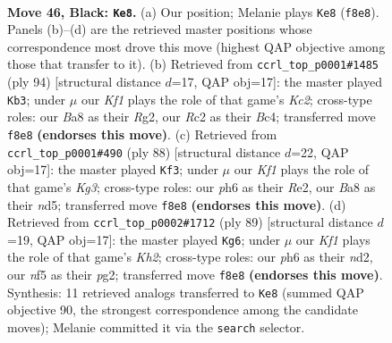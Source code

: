 \documentclass[11pt]{article}
\begin{document}
\clearpage

\begin{figure}[p]\centering
\begin{subfigure}{0.46\textwidth}\centering
\resizebox{\linewidth}{!}{%
\newchessgame
\chessboard[
  setfen={b4k2/P4p1K/7P/4PN2/8/R4p2/2r5/8 b - - 0 46},
  showmover=false,
  pgfstyle=straightmove, color=movearrow, markmove={f8-e8}
]}
\caption{}
\end{subfigure}\hfill
\begin{subfigure}{0.46\textwidth}\centering
\resizebox{\linewidth}{!}{%
\newchessgame
\chessboard[
  setfen={5r1k/7p/2n5/p3p3/2B1P3/8/1PK2PR1/8 w - - 6 48},
  showmover=false,
  pgfstyle=straightmove, color=movearrow, markmove={c2-b3}
]}
\caption{}
\end{subfigure}
\\[4pt]
\begin{subfigure}{0.46\textwidth}\centering
\resizebox{\linewidth}{!}{%
\newchessgame
\chessboard[
  setfen={8/3k4/2p4B/3n4/2r3P1/1p4K1/1P2R3/8 w - - 0 45},
  showmover=false,
  pgfstyle=straightmove, color=movearrow, markmove={g3-f3}
]}
\caption{}
\end{subfigure}\hfill
\begin{subfigure}{0.46\textwidth}\centering
\resizebox{\linewidth}{!}{%
\newchessgame
\chessboard[
  setfen={3b4/6pk/1r6/8/R6p/7P/3N1PP1/5K2 b - - 9 45},
  showmover=false,
  pgfstyle=straightmove, color=movearrow, markmove={h7-g6}
]}
\caption{}
\end{subfigure}
\caption{\textbf{Move 46, Black: \texttt{Ke8}.} (a) Our position; Melanie plays \texttt{Ke8} (\texttt{f8e8}). Panels (b)--(d) are the retrieved master positions whose correspondence most drove this move (highest QAP objective among those that transfer to it). (b) Retrieved from \texttt{ccrl\_top\_p0001\#1485} (ply 94) [structural distance $d$=17, QAP obj=17]: the master played \texttt{Kb3}; under $\mu$ our \emph{Kf1} plays the role of that game's \emph{Kc2}; cross-type roles: our \emph{B}a8 as their \emph{R}g2, our \emph{R}c2 as their \emph{B}c4; transferred move \texttt{f8e8} \textbf{(endorses this move)}. (c) Retrieved from \texttt{ccrl\_top\_p0001\#490} (ply 88) [structural distance $d$=22, QAP obj=17]: the master played \texttt{Kf3}; under $\mu$ our \emph{Kf1} plays the role of that game's \emph{Kg3}; cross-type roles: our \emph{p}h6 as their \emph{R}e2, our \emph{B}a8 as their \emph{n}d5; transferred move \texttt{f8e8} \textbf{(endorses this move)}. (d) Retrieved from \texttt{ccrl\_top\_p0002\#1712} (ply 89) [structural distance $d$=19, QAP obj=17]: the master played \texttt{Kg6}; under $\mu$ our \emph{Kf1} plays the role of that game's \emph{Kh2}; cross-type roles: our \emph{p}h6 as their \emph{n}d2, our \emph{n}f5 as their \emph{p}g2; transferred move \texttt{f8e8} \textbf{(endorses this move)}. Synthesis: 11 retrieved analogs transferred to \texttt{Ke8} (summed QAP objective 90, the strongest correspondence among the candidate moves); Melanie committed it via the \texttt{search} selector.}
\label{fig:thought-m91}
\end{figure}
\end{document}

